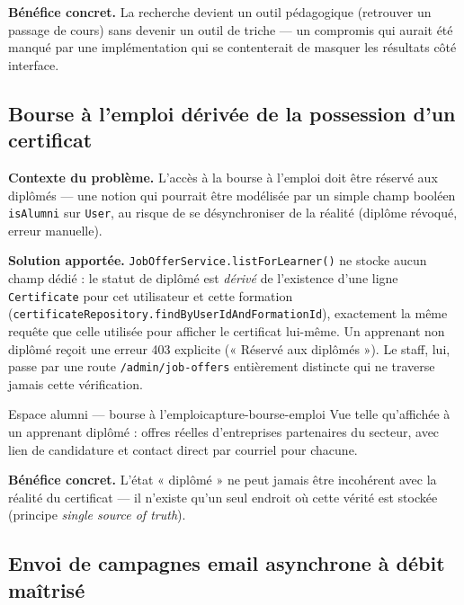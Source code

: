 \textbf{Bénéfice concret.} La recherche devient un outil pédagogique
(retrouver un passage de cours) sans devenir un outil de triche --- un
compromis qui aurait été manqué par une implémentation qui se contenterait
de masquer les résultats côté interface.

\subsection{Bourse à l'emploi dérivée de la possession d'un certificat}
\label{sec:bourse-emploi}

\textbf{Contexte du problème.} L'accès à la bourse à l'emploi doit être
réservé aux diplômés --- une notion qui pourrait être modélisée par un
simple champ booléen \texttt{isAlumni} sur \texttt{User}, au risque de se
désynchroniser de la réalité (diplôme révoqué, erreur manuelle).

\textbf{Solution apportée.} \texttt{Job\allowbreak Offer\allowbreak Service.listForLearner()} ne
stocke aucun champ dédié : le statut de diplômé est \emph{dérivé} de
l'existence d'une ligne \texttt{Certificate} pour cet utilisateur et cette
formation (\texttt{certificate\allowbreak Repository.find\allowbreak By\allowbreak User\allowbreak Id\allowbreak And\allowbreak Formation\allowbreak Id}),
exactement la même requête que celle utilisée pour afficher le certificat
lui-même. Un apprenant non diplômé reçoit une erreur 403 explicite
(« Réservé aux diplômés »). Le staff, lui, passe par une route
\texttt{/admin/job-offers} entièrement distincte qui ne traverse jamais
cette vérification.

  {Espace alumni --- bourse à l'emploi}{capture-bourse-emploi}
  {Vue telle qu'affichée à un apprenant diplômé : offres réelles
   d'entreprises partenaires du secteur, avec lien de candidature et
   contact direct par courriel pour chacune.}

\textbf{Bénéfice concret.} L'état « diplômé » ne peut jamais être
incohérent avec la réalité du certificat --- il n'existe qu'un seul endroit
où cette vérité est stockée (principe \emph{single source of truth}).

\subsection{Envoi de campagnes email asynchrone à débit maîtrisé}
\label{sec:campagne-email}

